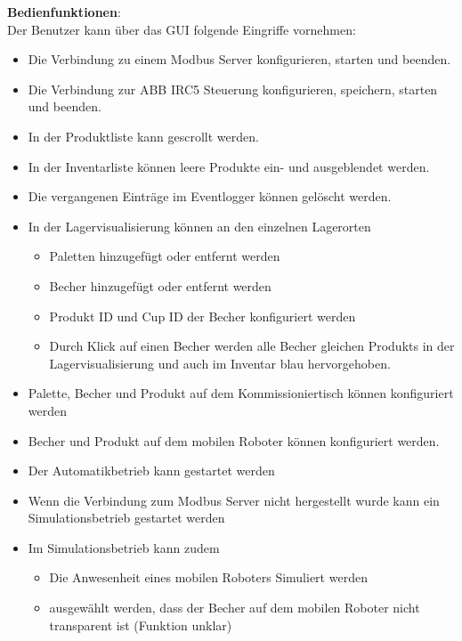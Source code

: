 \textbf{Bedienfunktionen}:\\
Der Benutzer kann über das GUI folgende Eingriffe vornehmen:\\
\begin{itemize}
    \item Die Verbindung zu einem Modbus Server konfigurieren, starten und beenden.
    \item Die Verbindung zur ABB IRC5 Steuerung konfigurieren, speichern, starten und beenden.
    \item In der Produktliste kann gescrollt werden.
    \item In der Inventarliste können leere Produkte ein- und ausgeblendet werden.
    \item Die vergangenen Einträge im Eventlogger können gelöscht werden.
    \item In der Lagervisualisierung können an den einzelnen Lagerorten
    \begin{itemize}
        \item Paletten hinzugefügt oder entfernt werden
        \item Becher hinzugefügt oder entfernt werden
        \item Produkt ID und Cup ID der Becher konfiguriert werden
        \item Durch Klick auf einen Becher werden alle Becher gleichen Produkts in der Lagervisualisierung und auch im
        Inventar blau hervorgehoben.
    \end{itemize}
    \item Palette, Becher und Produkt auf dem Kommissioniertisch können konfiguriert werden
    \item Becher und Produkt auf dem mobilen Roboter können konfiguriert werden.
    \item Der Automatikbetrieb kann gestartet werden
    \item Wenn die Verbindung zum Modbus Server nicht hergestellt wurde kann ein Simulationsbetrieb gestartet werden
    \item Im Simulationsbetrieb kann zudem
    \begin{itemize}
        \item Die Anwesenheit eines mobilen Roboters Simuliert werden
        \item ausgewählt werden, dass der Becher auf dem mobilen Roboter nicht transparent ist (Funktion unklar)
    \end{itemize}
\end{itemize}

